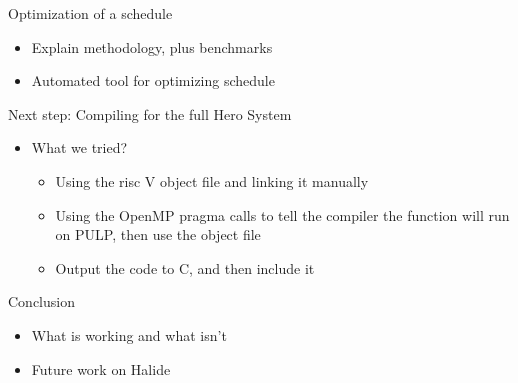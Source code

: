 \documentclass[aspectratio=169]{beamer}
\begin{document}
\begin{frame}{Optimization of a schedule}
	\begin{itemize}
		\item Explain methodology, plus benchmarks
		\item Automated tool for optimizing schedule
	\end{itemize}
\end{frame}

\begin{frame}{Next step: Compiling for the full Hero System}
	\begin{itemize}
		\item What we tried? 
			\begin{itemize}
				\item Using the risc V object file and linking it manually
				\item Using the OpenMP pragma calls to tell the compiler the function will run on PULP, then use the object file
				\item Output the code to C, and then include it
			\end{itemize}
	\end{itemize}
\end{frame}

\begin{frame}{Conclusion}
	\begin{itemize}
		\item What is working and what isn't
		\item Future work on Halide
	\end{itemize}
\end{frame}
\end{document}
